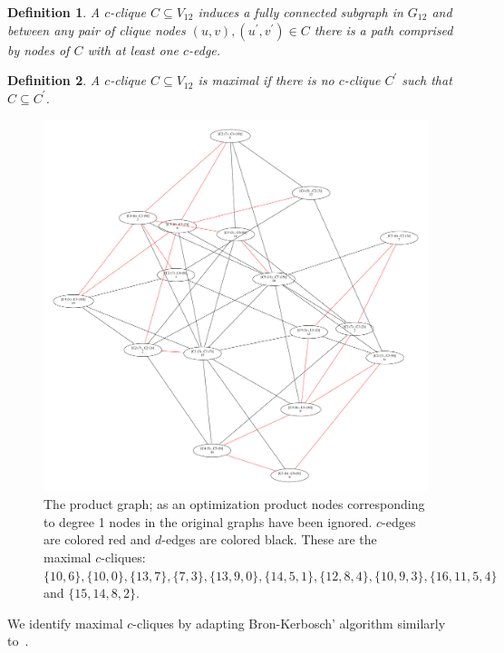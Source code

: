 \documentclass[11pt]{article}
\newtheorem{definition}{Definition}[section]
\begin{document}
\begin{definition}
A \emph{$c$-clique} $C \subseteq V_{12}$ induces a fully connected subgraph in
$G_{12}$ and between any pair of clique nodes $(u,v),(u^\prime,v^\prime) \in C$
there is a path comprised by nodes of $C$ with at least one $c$-edge.
\end{definition}

\begin{definition}
A $c$-clique $C \subseteq V_{12}$ is \emph{maximal} if there is no
$c$-clique $C^\prime$ such that $C \subseteq C^\prime$.
\end{definition}

\begin{figure}
  \center
  \includegraphics[width=1.1\textwidth]{images/product}
  \caption{The product graph; as an optimization product nodes corresponding to
    degree 1 nodes in the original graphs have been ignored. $c$-edges are
    colored red and $d$-edges are colored black. These are the maximal
    $c$-cliques: $\{10,6\}, \{10,0\}, \{13, 7\},
    \{7, 3\}, \{13, 9, 0\}, \{14, 5, 1\}, \{12, 8, 4\}, \{10, 9, 3\}, \{16, 11,
    5, 4\}$ and $\{15, 14, 8, 2\}$.}
  \label{fig:product}
\end{figure}

We identify maximal $c$-cliques by adapting Bron-Kerbosch' algorithm similarly
to~\cite{Koch:1996fc,Koch:2001wi}.
\end{document}
